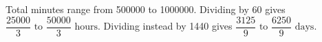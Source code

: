 Total minutes range from 500000 to 1000000. Dividing by 60 gives $\boxed{\dfrac{25000}{3}\text{ to }\dfrac{50000}{3}\text{ hours}}$. Dividing instead by 1440 gives $\boxed{\dfrac{3125}{9}\text{ to }\dfrac{6250}{9}\text{ days}}$.
